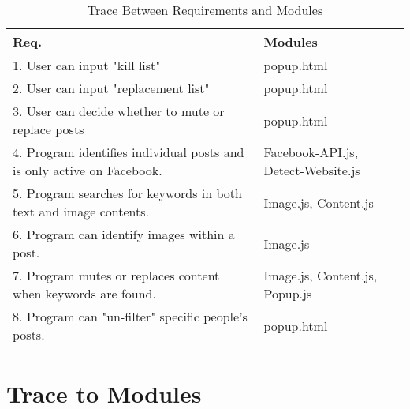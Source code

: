 \documentclass[12pt, titlepage]{article}
\begin{document}
\begin{table}[H]
\centering
\begin{tabular}{p{} p{}}
\toprule
\textbf{Req.} & \textbf{Modules}\\
\midrule
1. User can input "kill list" &  popup.html\\
2. User can input "replacement list" &  popup.html\\
3. User can decide whether to mute or replace posts &  popup.html\\
4. Program identifies individual posts and is only active on Facebook. &  Facebook-API.js, Detect-Website.js\\ 
5. Program searches for keywords in both text and image contents.  &  Image.js, Content.js\\
6. Program can identify images within a post. &  Image.js\\
7. Program mutes or replaces content when keywords are found. &  Image.js, Content.js, Popup.js\\
8. Program can "un-filter" specific people's posts. &  popup.html\\
\bottomrule
\end{tabular}
\caption{Trace Between Requirements and Modules}
\label{TblRT}
\end{table}
		
\section{Trace to Modules}
\end{document}
